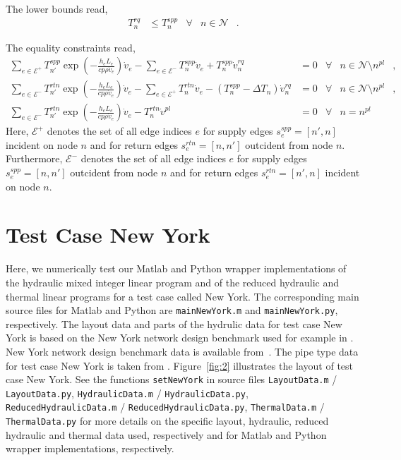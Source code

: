 \documentclass[a4paper,10pt]{article}
\begin{document}
The lower bounds read,
\begin{align}
 T_n^{rq}   &\le T_{n}^{spp}          &\forall& n\in\mathcal{N} &.
\end{align}

The equality constraints read,
\begin{align}
 \sum_{e\in \mathcal{E}^+} T_{n'}^{spp}\exp\left(-\frac{h_e L_e}{cp\rho\dot{v}_{e}}\right) \dot{v}_{e}  - \sum_{e\in \mathcal{E}^-} T_{n}^{spp} \dot{v}_{e} + T_n^{spp}\dot{v}_n^{rq} &= 0&\forall& n\in\mathcal{N}\setminus n^{pl}  &,\\
 \sum_{e\in \mathcal{E}^-} T_{n'}^{rtn}\exp\left(-\frac{h_e L_e}{cp\rho\dot{v}_{e}}\right) \dot{v}_{e}  - \sum_{e\in \mathcal{E}^+} T_{n}^{rtn} \dot{v}_{e} - (T_n^{spp}-\Delta T_n)\dot{v}_n^{rq} &= 0&\forall& n\in\mathcal{N}\setminus n^{pl}  &,\\
 \sum_{e\in \mathcal{E}^-} T_{n'}^{rtn}\exp\left(-\frac{h_e L_e}{cp\rho\dot{v}_{e}}\right) \dot{v}_{e}  - T_n^{rtn}\dot{v}^{pl} &= 0&\forall& n=n^{pl}  &
\end{align}
Here, $\mathcal{E}^+$ denotes the set of all edge indices $e$ for supply edges $s_e^{spp}=[n',n]$ incident on node $n$ and for return edges $s_e^{rtn}=[n,n']$ outcident from node $n$.
Furthermore, $\mathcal{E}^-$ denotes the set of all edge indices $e$ for supply edges $s_e^{spp}=[n,n']$ outcident from node $n$ and for return edges $s_e^{rtn}=[n',n]$ incident on node $n$.



\section{Test Case New York}

Here, we numerically test our Matlab and Python wrapper implementations of the hydraulic mixed integer linear program and of the reduced hydraulic and thermal linear programs for a test case called New York.
The corresponding main source files for Matlab and Python are \texttt{mainNewYork.m} and \texttt{mainNewYork.py}, respectively.
The layout data and parts of the hydrulic data for test case New York is based on the New York network design benchmark used for example in \cite{Fu}.
New York network design benchmark data is available from~\cite{Benchmarks}.
The pipe type data for test case New York is taken from \cite[Section~2.4]{Jimeno}.
Figure~\ref{fig:2} illustrates the layout of test case New York.
See the functions \texttt{setNewYork} in source files \texttt{LayoutData.m} / \texttt{LayoutData.py}, \texttt{HydraulicData.m} / \texttt{HydraulicData.py}, \texttt{ReducedHydraulicData.m} / \texttt{ReducedHydraulicData.py}, \texttt{ThermalData.m} / \texttt{ThermalData.py}  for more details on the specific layout, hydraulic, reduced hydraulic and thermal data used, respectively and for Matlab and Python wrapper implementations, respectively. 
\end{document}
